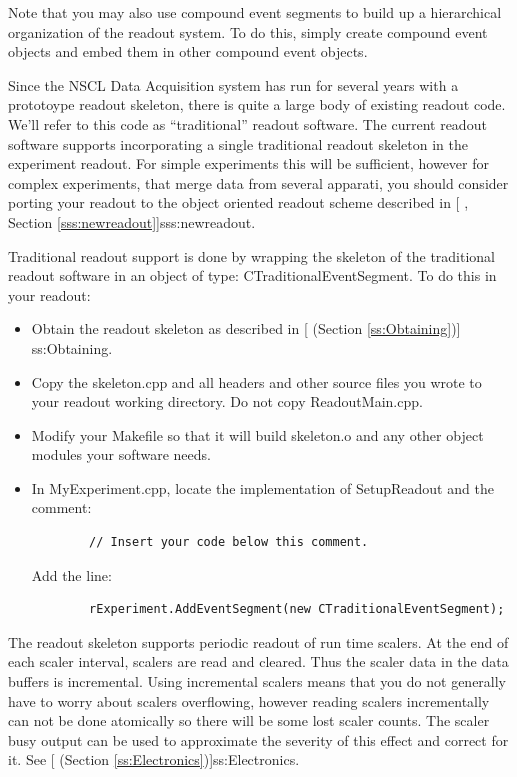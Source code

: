       Note that you may also use compound event segments to build
   up a hierarchical organization of the readout system.  To do this,
   simply create compound event objects and embed them in other compound
   event objects.

   Since the NSCL Data Acquisition system has run for several years with
   a prototoype readout skeleton, there is quite a large body of existing
   readout code.  We'll refer to this code as ``traditional'' readout software.
   The current readout software supports incorporating a single traditional
   readout skeleton in the experiment readout.  For simple experiments this 
   will be sufficient, however for complex experiments, that merge data from
   several apparati, you should consider porting your readout to the object
   oriented readout scheme described in [
   , Section \ref{sss:newreadout}]{sss:newreadout}.
   
   Traditional readout support is done by wrapping the skeleton of the traditional
   readout software in an object of type: CTraditionalEventSegment. To do this in your readout:
   \begin{itemize}
      \item Obtain the readout skeleton as described in 
      [ (Section \ref{ss:Obtaining})]
      {ss:Obtaining}.
      \item Copy the skeleton.cpp and all headers and other source files you
	 wrote to your readout working directory.  Do not copy ReadoutMain.cpp.
      \item Modify your Makefile so that it will build skeleton.o and any other 
	 object modules your software needs.
      \item In MyExperiment.cpp, locate the implementation of 
	    SetupReadout and the comment:
	    \begin{verbatim}
	    // Insert your code below this comment.
	    \end{verbatim}
	    Add the line:
	    \begin{verbatim}
	    rExperiment.AddEventSegment(new CTraditionalEventSegment);
	    \end{verbatim}
   \end{itemize}
      The readout skeleton supports periodic readout of run time scalers.  
      At the end of each scaler interval, scalers are read and cleared. 
      Thus the scaler data in the data buffers is incremental.  Using
      incremental scalers means that you do not generally have to worry 
      about scalers overflowing, however reading scalers incrementally  can
      not be done atomically so there will be some lost scaler counts.
      The scaler busy output can be used to approximate the severity of this
      effect and correct for it.  See 
      [ 
      (Section \ref{ss:Electronics})]{ss:Electronics}.
      
